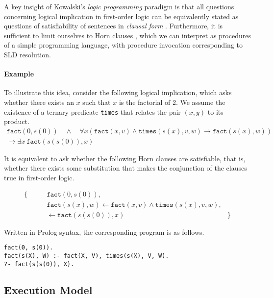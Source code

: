 A key insight of Kowalski's \emph{logic programming} paradigm is that all questions concerning logical implication in first-order logic can be equivalently stated as questions of satisfiability of sentences in \emph{clausal form} \cite{kowalskiPredicateLogicProgramming1974}. Furthermore, it is sufficient to limit ourselves to Horn clauses \cite{hillLUSHresolutionitscompleteness1974}, which we can interpret as procedures of a simple programming language, with procedure invocation corresponding to SLD resolution.

\paragraph{Example}

To illustrate this idea, consider the following logical implication, which asks whether there exists an $x$ such that $x$ is the factorial of 2. We assume the existence of a ternary predicate \texttt{times} that relates the pair $(x, y)$ to its product.
\begin{gather*}
\texttt{fact}(0, s(0)) \quad \land \quad \forall x (\texttt{fact}(x, v) \land \texttt{times}(s(x), v, w) \rightarrow \texttt{fact}(s(x), w)) \\
\rightarrow \exists x \ \texttt{fact}(s(s(0)), x)
\end{gather*}

It is equivalent to ask whether the following Horn clauses are satisfiable, that is, whether there exists some substitution that makes the conjunction of the clauses true in first-order logic.

\begin{align*}
\{ \qquad & \texttt{fact}(0, s(0)), \\
& \texttt{fact}(s(x), w) \leftarrow \texttt{fact}(x, v) \land \texttt{times}(s(x), v, w), \\
& \leftarrow \texttt{fact}(s(s(0)), x) & \}
\end{align*}

Written in Prolog syntax, the corresponding program is as follows.

\begin{center}
\begin{verbatim}
fact(0, s(0)).
fact(s(X), W) :- fact(X, V), times(s(X), V, W).
?- fact(s(s(0)), X).
\end{verbatim}
\end{center}

\subsection{Execution Model}

